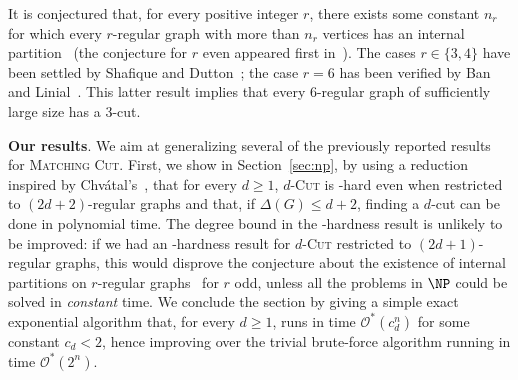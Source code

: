 \documentclass[a4paper,UKenglish,cleveref, autoref]{lipics-v2019}
\newcommand{\bigOs}[1]{\mathcal{O}^*\!\left(#1\right)}
\newcommand{\pname}[1]{\textsc{#1}}
\begin{document}
It is conjectured that, for every positive integer $r$, there exists some constant $n_r$ for which every $r$-regular graph with more than $n_r$ vertices has an internal partition~\cite{DeVos09,internal_partition_regular6} (the conjecture for $r$ even appeared first in~\cite{internal_partition_regular3_4}).
The cases $r \in \{3,4\}$ have been settled by Shafique and Dutton~\cite{internal_partition_regular3_4}; the case $r=6$ has been verified by Ban and Linial~\cite{internal_partition_regular6}.
This latter result implies that every 6-regular graph of sufficiently large size has a 3-cut.

\medskip

\noindent \textbf{Our results}. We aim at generalizing several of the previously reported results  for \pname{Matching Cut}.
First, we show in Section~\ref{sec:np}, by using a reduction inspired by Chvátal's~\cite{chvatal_matching_cut}, that for every $d \geq 1$, \pname{$d$-Cut} is \NP-hard even when restricted to $(2d+2)$-regular graphs and that, if $\Delta(G) \leq d+2$, finding a $d$-cut can be done in polynomial time. The degree bound in the \NP-hardness result is unlikely to be improved: if we had an \NP-hardness result for \textsc{$d$-Cut} restricted to $(2d+1)$-regular graphs, this would disprove the conjecture about the existence of internal partitions on $r$-regular graphs~\cite{DeVos09,internal_partition_regular6,internal_partition_regular3_4} for $r$ odd, unless all the problems in $\NP$ could be solved in {\sl constant} time. We conclude the section by giving a simple exact exponential algorithm that,  for every $d \geq 1$, runs in time $\bigOs{c_d^n}$ for some constant $c_d < 2$, hence improving over the trivial brute-force algorithm running in time $\bigOs{2^n}$.
\end{document}
